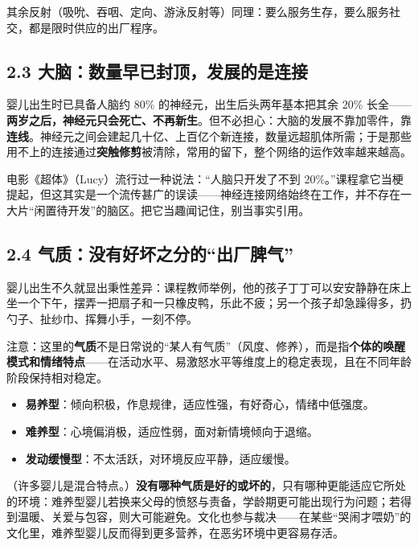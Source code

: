 \documentclass[UTF8,a4paper,11pt]{ctexart}
\begin{document}
其余反射（吸吮、吞咽、定向、游泳反射等）同理：要么服务生存，要么服务社交，都是限时供应的出厂程序。

\subsection*{2.3 大脑：数量早已封顶，发展的是连接}

\begin{keyconcept}
婴儿出生时已具备人脑约 80\% 的神经元，出生后头两年基本把其余 20\% 长全——\textbf{两岁之后，神经元只会死亡、不再新生}。但不必担心：大脑的发展不靠加零件，靠\textbf{连线}。神经元之间会建起几十亿、上百亿个新连接，数量远超肌体所需；于是那些用不上的连接通过\textbf{突触修剪}被清除，常用的留下，整个网络的运作效率越来越高。
\end{keyconcept}

电影《超体》（Lucy）流行过一种说法：“人脑只开发了不到 20\%。”课程拿它当梗提起，但这其实是一个流传甚广的误读——神经连接网络始终在工作，并不存在一大片“闲置待开发”的脑区。把它当趣闻记住，别当事实引用。

\subsection*{2.4 气质：没有好坏之分的“出厂脾气”}

婴儿出生不久就显出秉性差异：课程教师举例，他的孩子丁丁可以安安静静在床上坐一个下午，摆弄一把扇子和一只橡皮鸭，乐此不疲；另一个孩子却急躁得多，扔勺子、扯纱巾、挥舞小手，一刻不停。

注意：这里的\textbf{气质}不是日常说的“某人有气质”（风度、修养），而是指\textbf{个体的唤醒模式和情绪特点}——在活动水平、易激怒水平等维度上的稳定表现，且在不同年龄阶段保持相对稳定。

\begin{keyconcept}[三种气质类型与“匹配”思想]
\begin{itemize}
  \item \textbf{易养型}：倾向积极，作息规律，适应性强，有好奇心，情绪中低强度。
  \item \textbf{难养型}：心境偏消极，适应性弱，面对新情境倾向于退缩。
  \item \textbf{发动缓慢型}：不太活跃，对环境反应平静，适应缓慢。
\end{itemize}
（许多婴儿是混合特点。）\textbf{没有哪种气质是好的或坏的}，只有哪种更能适应它所处的环境：难养型婴儿若换来父母的愤怒与责备，学龄期更可能出现行为问题；若得到温暖、关爱与包容，则大可能避免。文化也参与裁决——在某些“哭闹才喂奶”的文化里，难养型婴儿反而得到更多营养，在恶劣环境中更容易存活。
\end{keyconcept}
\end{document}
